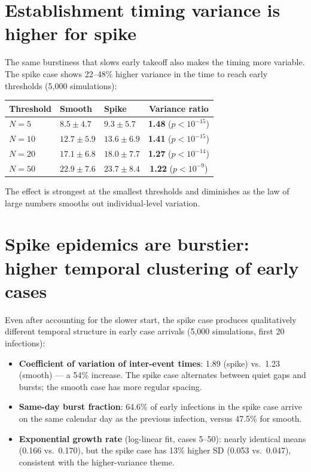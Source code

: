 \documentclass[11pt]{article}
\begin{document}
\section{Establishment timing variance is higher for spike}

The same burstiness that slows early takeoff also makes the timing more variable. The spike case shows 22--48\% higher variance in the time to reach early thresholds (5,000 simulations):

\medskip
\begin{tabular}{lllc}
\toprule
Threshold & Smooth & Spike & Variance ratio \\
\midrule
$N = 5$  & $8.5 \pm 4.7$ & $9.3 \pm 5.7$ & \textbf{1.48} ($p < 10^{-15}$) \\
$N = 10$ & $12.7 \pm 5.9$ & $13.6 \pm 6.9$ & \textbf{1.41} ($p < 10^{-15}$) \\
$N = 20$ & $17.1 \pm 6.8$ & $18.0 \pm 7.7$ & \textbf{1.27} ($p < 10^{-14}$) \\
$N = 50$ & $22.9 \pm 7.6$ & $23.7 \pm 8.4$ & \textbf{1.22} ($p < 10^{-9}$) \\
\bottomrule
\end{tabular}
\medskip

The effect is strongest at the smallest thresholds and diminishes as the law of large numbers smooths out individual-level variation.

\section{Spike epidemics are burstier: higher temporal clustering of early cases}

Even after accounting for the slower start, the spike case produces qualitatively different temporal structure in early case arrivals (5,000 simulations, first 20 infections):

\begin{itemize}
\item \textbf{Coefficient of variation of inter-event times}: 1.89 (spike) vs.\ 1.23 (smooth) --- a 54\% increase. The spike case alternates between quiet gaps and bursts; the smooth case has more regular spacing.
\item \textbf{Same-day burst fraction}: 64.6\% of early infections in the spike case arrive on the same calendar day as the previous infection, versus 47.5\% for smooth.
\item \textbf{Exponential growth rate} (log-linear fit, cases 5--50): nearly identical means (0.166 vs.\ 0.170), but the spike case has 13\% higher SD (0.053 vs.\ 0.047), consistent with the higher-variance theme.
\end{itemize}
\end{document}
